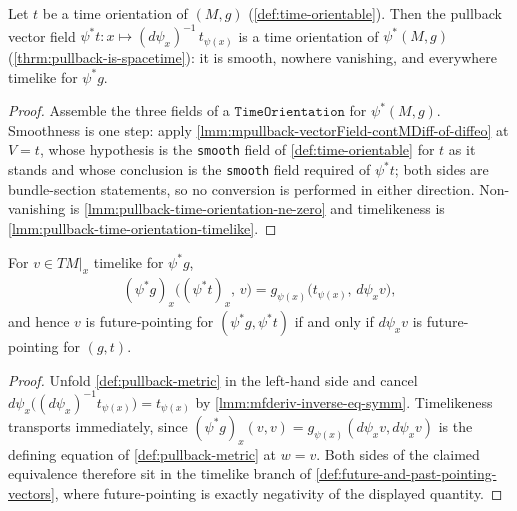 \begin{lemma}
    \label{lmm:pullback-time-orientation}
    \leanok
    Let $t$ be a time orientation of $(M,g)$ (\ref{def:time-orientable}). Then the pullback vector field $\psi^*t : x \mapsto (d\psi_x)^{-1}\,t_{\psi(x)}$ is a time orientation of $\psi^*(M,g)$ (\ref{thrm:pullback-is-spacetime}): it is smooth, nowhere vanishing, and everywhere timelike for $\psi^*g$.
\end{lemma}
\begin{proof}
    \leanok
    Assemble the three fields of a $\mathtt{TimeOrientation}$ for $\psi^*(M,g)$. Smoothness is one step: apply \ref{lmm:mpullback-vectorField-contMDiff-of-diffeo} at $V = t$, whose hypothesis is the \texttt{smooth} field of \ref{def:time-orientable} for $t$ as it stands and whose conclusion is the \texttt{smooth} field required of $\psi^*t$; both sides are bundle-section statements, so no conversion is performed in either direction. Non-vanishing is \ref{lmm:pullback-time-orientation-ne-zero} and timelikeness is \ref{lmm:pullback-time-orientation-timelike}.
\end{proof}

\begin{lemma}
    \label{lmm:pullback-future-pointing-timelike}
    \leanok
    For $v \in TM|_x$ timelike for $\psi^*g$,
    \begin{align}
        (\psi^*g)_x\big((\psi^*t)_x,\, v\big) = g_{\psi(x)}\big(t_{\psi(x)},\, d\psi_x v\big),
    \end{align}
    and hence $v$ is future-pointing for $(\psi^*g, \psi^*t)$ if and only if $d\psi_x v$ is future-pointing for $(g,t)$.
\end{lemma}
\begin{proof}
    \leanok
    Unfold \ref{def:pullback-metric} in the left-hand side and cancel $d\psi_x\big((d\psi_x)^{-1} t_{\psi(x)}\big) = t_{\psi(x)}$ by \ref{lmm:mfderiv-inverse-eq-symm}. Timelikeness transports immediately, since $(\psi^*g)_x(v,v) = g_{\psi(x)}(d\psi_x v, d\psi_x v)$ is the defining equation of \ref{def:pullback-metric} at $w = v$. Both sides of the claimed equivalence therefore sit in the timelike branch of \ref{def:future-and-past-pointing-vectors}, where future-pointing is exactly negativity of the displayed quantity.
\end{proof}

